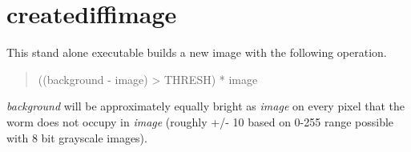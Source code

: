 \documentclass[letterpaper,10pt,oneside]{sphinxmanual}
\begin{document}
\label{index:module-creatediffimage}

\chapter{creatediffimage}
\label{index:creatediffimage}
This stand alone executable builds a new image with the following
operation.
\begin{quote}

((background - image) \textgreater{} THRESH) * image
\end{quote}

\emph{background} will be approximately equally bright as \emph{image} on every
pixel that the worm does not occupy in \emph{image} (roughly +/- 10 based on 
0-255 range possible with 8 bit grayscale images).
\end{document}
